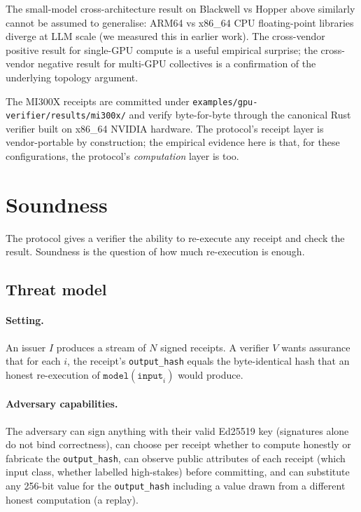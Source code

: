 \documentclass[10pt]{article}
\begin{document}
The small-model cross-architecture result on Blackwell vs Hopper above similarly cannot be assumed to generalise: ARM64 vs x86\_64 CPU floating-point libraries diverge at LLM scale (we measured this in earlier work). The cross-vendor positive result for single-GPU compute is a useful empirical surprise; the cross-vendor negative result for multi-GPU collectives is a confirmation of the underlying topology argument.

The MI300X receipts are committed under \texttt{examples/gpu-verifier/results/mi300x/} and verify byte-for-byte through the canonical Rust verifier built on x86\_64 NVIDIA hardware. The protocol's receipt layer is vendor-portable by construction; the empirical evidence here is that, for these configurations, the protocol's \emph{computation} layer is too.

\section{Soundness}
\label{sec:soundness}

The protocol gives a verifier the ability to re-execute any receipt and check the result. Soundness is the question of how much re-execution is enough.

\subsection{Threat model}

\paragraph{Setting.} An issuer $I$ produces a stream of $N$ signed receipts. A verifier $V$ wants assurance that for each $i$, the receipt's \texttt{output\_hash} equals the byte-identical hash that an honest re-execution of $\texttt{model}(\texttt{input}_i)$ would produce.

\paragraph{Adversary capabilities.} The adversary can sign anything with their valid Ed25519 key (signatures alone do not bind correctness), can choose per receipt whether to compute honestly or fabricate the \texttt{output\_hash}, can observe public attributes of each receipt (which input class, whether labelled high-stakes) before committing, and can substitute any 256-bit value for the \texttt{output\_hash} including a value drawn from a different honest computation (a replay).
\end{document}
